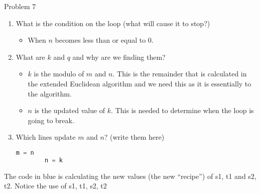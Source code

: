 \begin{problem}{Problem 7}
\begin{Highlight}[Solution]
        \begin{enumerate}[start = 4]
            \item What is the condition on the loop (what will cause it to stop?)
            \begin{itemize}
                \item When $n$ becomes less than or equal to 0.
            \end{itemize}
            \item What are $k$ and $q$ and why are we finding them?
            \begin{itemize}
                \item $k$ is the modulo of $m$ and $n$. This is the remainder that is calculated in the extended Euclidean algorithm and we need this as it is essentially to the algorithm.
                \item $n$ is the updated value of $k$. This is needed to determine when the loop is going to break.
            \end{itemize}
            \item Which lines update $m$ and $n$? (write them here)
    \begin{lstlisting}[style=stackoverflow, language=python]
        m = n
        n = k
    \end{lstlisting}
        \end{enumerate}
        The code in blue is calculating the new values (the new “recipe”) of s1, t1 and s2, t2. Notice the use of s1, t1, s2, t2


\end{Highlight}
\end{problem}
